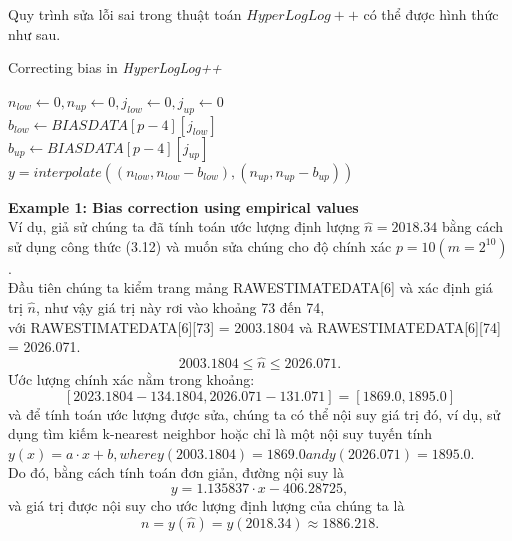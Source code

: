 \documentclass[letterpaper,13pt]{article}
\theoremstyle{mytheor}
\begin{document}
\indent Quy trình sửa lỗi sai trong thuật toán $HyperLogLog++$ có thể được hình thức như sau.\\
\begin{algorithm}[H]
    \vspace{0.25cm}
    \DontPrintSemicolon
    \LinesNumberedHidden
    \caption[]{Correcting bias in \textit{HyperLogLog++}}
    $n_{low} \gets 0, n_{up} \gets 0, j_{low} \gets 0, j_{up} \gets 0 $\\
    $b_{low} \gets BIASDATA[p-4][j_{low}]$\\
    $b_{up} \gets BIASDATA[p-4][j_{up}]$\\
    $y = interpolate\left(\left(n_{low}, n_{low} - b_{low}\right), \left(n_{up}, n_{up} - b_{up
    }\right)\right)$\\
    \vspace{0.25cm}
\end{algorithm}
\begin{mdframed}
    \vspace{0.25cm}
    \textbf{Example 1: Bias correction using empirical values}\\
    Ví dụ, giả sử chúng ta đã tính toán ước lượng định lượng $\hat{n} = 2018.34$ bằng cách sử dụng công thức (3.12) và muốn sửa chúng cho 
    độ chính xác $p = 10 (m = 2^{10})$.\\
    Đầu tiên chúng ta kiểm trang mảng RAWESTIMATEDATA[6] và xác định giá trị $\hat{n}$, như vậy giá trị này rơi vào khoảng 73 đến 74,\\ với RAWESTIMATEDATA[6][73] = 2003.1804 và
    RAWESTIMATEDATA[6][74] = 2026.071.
    \[2003.1804 \le \hat{n} \le 2026.071.\]
    Ước lượng chính xác nằm trong khoảng:
    \[\left[2023.1804 - 134.1804, 2026.071 - 131.071\right] = \left[1869.0, 1895.0\right]\]
    và để tính toán ước lượng được sửa, chúng ta có thể nội suy giá trị đó, ví dụ, sử dụng tìm kiếm k-nearest neighbor hoặc chỉ là một nội suy tuyến tính\\
    $y(x) = a \cdot x + b, where y(2003.1804) = 1869.0 and y(2026.071) = 1895.0.$\\
    Do đó, bằng cách tính toán đơn giản, đường nội suy là
    \[y = 1.135837 \cdot x - 406.28725,\]
    và giá trị được nội suy cho ước lượng định lượng của chúng ta là
    \[n = y(\hat{n}) = y(2018.34) \approx 1886.218.\]
    
\end{mdframed}
\end{document}
